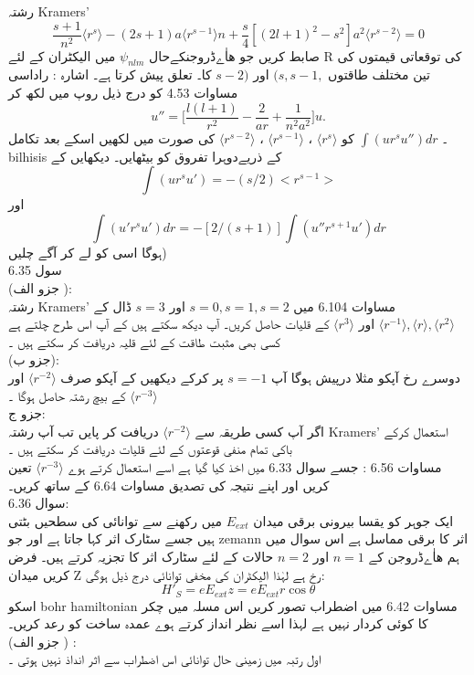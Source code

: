  رشتہ Kramers' 
\[\frac{s+1}{n^{2}}\langle r^{s}\rangle -(2s+1)a\langle r^{s-1}\rangle n+\frac{s}{4}[(2l+1)^{2}-s^{2}]a^{2}\langle r^{s-2}\rangle =0\]
صابط کریں جو ھاٰےڈروجنکےحال 
\(\psi_{nlm}\)
میں الیکٹران کے لئے R کی توقعاتی قیمتوں کی تین مختلف طاقتوں
\((s,s-1,\)
اور
\(s-2)\)
کا۔ تعلق پیش کرتا ہے۔ اشارہ : راداسی مساوات 4.53 کو درج ذیل روپ میں لکھ کر
\[u''=\big[\frac{l(l+1)}{r^{2}}-\frac{2}{ar}+\frac{1}{n^{2}a^{2}}\big]u.\]
۔
\(\int(ur^{s}u'')dr\)	 
کو 
\(\langle r^{s}\rangle\)
،
\(\langle r^{s-1}\rangle\)
،
\(\langle r^{s-2}\rangle \)
کی  صورت میں لکھیں اسکے بعد تکامل
bilhisis
کے ذریےدوہرا تفروق کو بیٹھایں۔ دیکھایں کے\\
\[\int(ur^{s}u')=-(s/2)<r^{s-1}>\]
اور
\[\int(u'r^{s}u')dr=-[2/(s+1)]\int(u''r^{s+1}u')dr\]
ہوگا اسی کو لے کر آگے چلیں)\\
سول 6.35\\ 
(جزو الف ):\\
 رشتہ Kramers' مساوات 6.104 میں
\(s=0,s=1,s=2\)
اور 
\(s=3\)
ڈال کے 
\(\langle r^{-1}\rangle,\langle r\rangle,\langle r^{2}\rangle\)
اور 
\(\langle r^{3}\rangle\)
کے قلیات حاصل کریں۔ آپ دیکھ سکتے ہیں کے آپ اس طرح چلتے ہے کسی بھی مثبت طاقت کے لئے قلیہ دریافت کر سکتے ہیں ۔\\
(جزو ب):\\ 
دوسرے رخ آپکو مثلا درپیش  ہوگا آپ 
\(s=-1\)
پر کرکے دیکھیں کے آپکو صرف 
\(\langle r^{-2}\rangle\)
اور 
\(\langle r^{-3}\rangle\)
کے بیچ رشتہ حاصل ہوگا ۔\\
جزو ج:\\
 اگر آپ کسی طریقہ سے
\(\langle r^{-2}\rangle\)
دریافت کر پایں تب آپ رشتہ Kramers' استعمال کرکے باکی تمام منفی قوعتوں کے لئے قلیات دریافت کر سکتے ہیں ۔\\
مساوات 6.56 : جسے سوال 6.33 میں اخذ کیا گیا ہے اسے استعمال کرتے ہوے 
\(\langle r^{-3}\rangle\)
تعین کریں اور اپنے نتیجہ کی تصدیق مساوات 6.64 کے ساتھ کریں۔\\
سوال 6.36: \\
ایک جوہر کو يقسا بیرونی برقی میدان
\(E_{ext}\)
میں رکھنے سے توانائی کی سطحیں بٹتی ہیں جسے سٹارک اثر کہا جاتا ہے اور جو zemann اثر کا برقی مماسل ہے اس سوال میں ہم ھاٰےڈروجن کے 
\(n=1\)
اور 
\(n=2\)
حالات کے لئے سٹارک اثر کا تجزیہ کرتے ہیں۔ فرض کریں میدان
Z
رخ ہے لہٰذا الیکٹران کی مخفی توانائی درج ذیل ہوگی: 
\[H'_{S}=eE_{ext}z=eE_{ext}r\cos{\theta}\]
اسکو bohr hamiltonian  مساوات 6.42 میں اضطراب تصور کریں اس مسلہ میں چکر کا کوئی کردار نہیں ہے لہذا اسے نظر انداز کرتے ہوے عمدہ ساخت کو رعد کریں۔\\
(جزو الف ) :\\
 اول رتبہ میں زمینی حال توانائی اس اضطراب سے اثر انداذ نہیں ہوتی ۔\\
